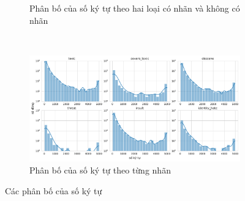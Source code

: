 \begin{figure}[htb]
\begin{subfigure}[t]{0.5\textwidth}
        \caption{Phân bố của số ký tự theo hai loại có nhãn và không có nhãn}
    \end{subfigure}\\
    \begin{subfigure}{\textwidth}
        \centering
        \includegraphics[width=\textwidth]{chapter_2/image/dist_num_chars_per_label.pdf}
        \caption{Phân bố của số ký tự theo từng nhãn}
    \end{subfigure}%
    \caption{Các phân bố của số ký tự}
    \label{figure:dist_number_of_chars}
\end{figure}

